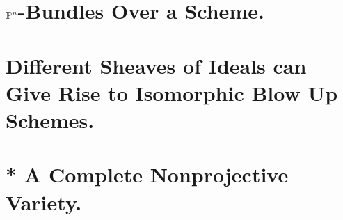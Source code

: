\documentclass[a4paper]{jsarticle}
\begin{document}
\section{$\mathbb{P}^n$-Bundles Over a Scheme.} %

\section{Different Sheaves of Ideals can Give Rise to Isomorphic Blow Up Schemes.} %

\section{ } %

\section{* A Complete Nonprojective Variety.} %
\end{document}

